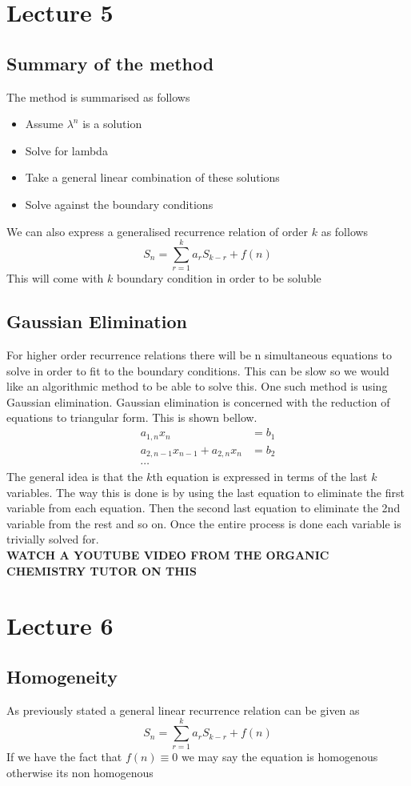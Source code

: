 \documentclass{article}
\begin{document}
\section{Lecture 5}
\subsection{Summary of the method}
The method is summarised as follows
\begin{itemize}
    \item Assume $\lambda^n$ is a solution
    \item Solve for lambda
    \item Take a general linear combination of these solutions
    \item  Solve against the boundary conditions
\end{itemize}
We can also express a generalised recurrence relation of order $k$ as follows
\[S_n = \sum_{r=1}^{k}a_rS_{k-r} + f(n)\]
This will come with $k$ boundary condition in order to be soluble
\subsection{Gaussian Elimination}
For higher order recurrence relations there will be n simultaneous equations to solve in order to fit to the boundary conditions. This can be slow so we would like an algorithmic method to be able to solve this. One such method is using Gaussian elimination. Gaussian elimination is concerned with the reduction of equations to triangular form. This is shown bellow.
\begin{align*}
    a_{1,n}x_n &= b_1 \\
    a_{2,n-1}x_{n - 1} + a_{2,n}x_n &= b_2 \\
    \cdots 
\end{align*}
The general idea is that the $k$th equation is expressed in terms of the last $k$ variables. The way this is done is by using the last equation to eliminate the first variable from each equation. Then the second last equation to eliminate the 2nd variable from the rest and so on. Once the entire process is done each variable is trivially solved for. \\
\textbf{WATCH A YOUTUBE VIDEO FROM THE ORGANIC CHEMISTRY TUTOR ON THIS}

\section{Lecture 6}
\subsection{Homogeneity}
As previously stated a general linear recurrence relation can be given as 
\[S_n = \sum_{r=1}^{k}a_rS_{k-r} + f(n)\]
If we have the fact that $f(n) \equiv 0$ we may say the equation is homogenous otherwise its non homogenous
\end{document}
